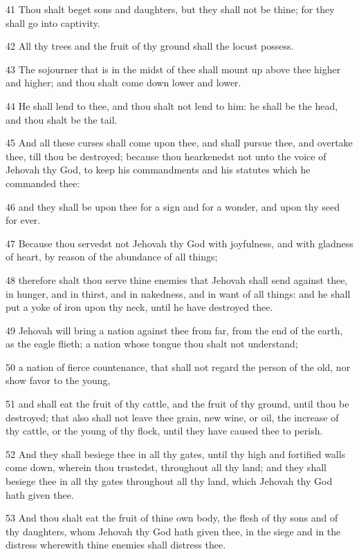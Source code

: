 \par 41 Thou shalt beget sons and daughters, but they shall not be thine; for they shall go into captivity.
\par 42 All thy trees and the fruit of thy ground shall the locust possess.
\par 43 The sojourner that is in the midst of thee shall mount up above thee higher and higher; and thou shalt come down lower and lower.
\par 44 He shall lend to thee, and thou shalt not lend to him: he shall be the head, and thou shalt be the tail.
\par 45 And all these curses shall come upon thee, and shall pursue thee, and overtake thee, till thou be destroyed; because thou hearkenedst not unto the voice of Jehovah thy God, to keep his commandments and his statutes which he commanded thee:
\par 46 and they shall be upon thee for a sign and for a wonder, and upon thy seed for ever.
\par 47 Because thou servedst not Jehovah thy God with joyfulness, and with gladness of heart, by reason of the abundance of all things;
\par 48 therefore shalt thou serve thine enemies that Jehovah shall send against thee, in hunger, and in thirst, and in nakedness, and in want of all things: and he shall put a yoke of iron upon thy neck, until he have destroyed thee.
\par 49 Jehovah will bring a nation against thee from far, from the end of the earth, as the eagle flieth; a nation whose tongue thou shalt not understand;
\par 50 a nation of fierce countenance, that shall not regard the person of the old, nor show favor to the young,
\par 51 and shall eat the fruit of thy cattle, and the fruit of thy ground, until thou be destroyed; that also shall not leave thee grain, new wine, or oil, the increase of thy cattle, or the young of thy flock, until they have caused thee to perish.
\par 52 And they shall besiege thee in all thy gates, until thy high and fortified walls come down, wherein thou trustedst, throughout all thy land; and they shall besiege thee in all thy gates throughout all thy land, which Jehovah thy God hath given thee.
\par 53 And thou shalt eat the fruit of thine own body, the flesh of thy sons and of thy daughters, whom Jehovah thy God hath given thee, in the siege and in the distress wherewith thine enemies shall distress thee.
